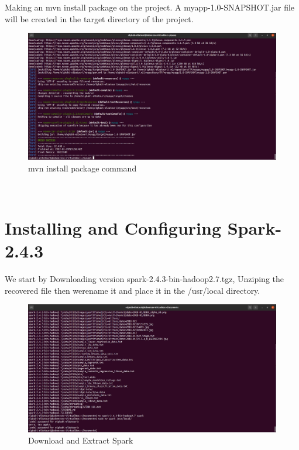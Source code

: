 \begin{spacing}{1.2}
\par Making an mvn install package on the project. A myapp-1.0-SNAPSHOT.jar file will be created in the target directory of the project.
\\
\begin{figure}[!htb] 
\begin{center} 
\includegraphics[width=1\linewidth]{Pictures/HBase/Data processing with Spark/Preparation of the environment/mvn install package command} 
\end{center} 
\caption{mvn install package command} 
\end{figure}  \FloatBarrier
\\
\newpage
\section{Installing and Configuring Spark-2.4.3 }
\par We start by Downloading version spark-2.4.3-bin-hadoop2.7.tgz, Unziping the recovered file then werename it and place it in the /usr/local directory.
\\
\begin{figure}[!htb] 
\begin{center} 
\includegraphics[width=1\linewidth]{Pictures/HBase/Data processing with Spark/Installing and Configuring Spark-2.4.3/Download and Extract Spark} 
\end{center} 
\caption{Download and Extract Spark} 
\end{figure}  \FloatBarrier
\\


\end{spacing}
